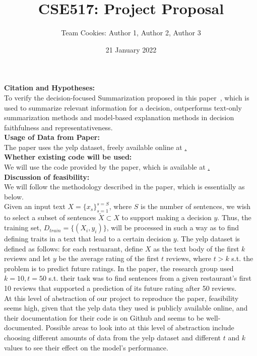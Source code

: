 \documentclass{article}
\title{CSE517: Project Proposal}
\author{Team Cookies: Author 1, Author 2, Author 3}
\date{21 January 2022}
\begin{document}
    \maketitle
    

    \textbf{Citation and Hypotheses:} \\

    To verify the decision-focused Summarization proposed in this paper~\cite{hsu-tan-2021-decision}, which is used to summarize relevant information for a decision,
    outperforms text-only summarization methods and model-based explanation methods in decision faithfulness and representativeness. \\

    \textbf{Usage of Data from Paper:} \\
    The paper uses the yelp dataset, freely available online at \href{https://www.yelp.com/dataset/download}. \\

    \textbf{Whether existing code will be used:} \\
    We will use the code provided by the paper, which is available at \href{https://github.com/ChicagoHAI/decsum}. \\

    \textbf{Discussion of feasibility:} \\
    We will follow the methodology described in the paper, which is essentially as below. \\

    Given an input text $X = \{x_s\}_{s=1}^{s=S}$, where $S$ is the number of sentences, we wish to select a subset of sentences $\tilde{X}\subset X$
    to support making a decision $y$. Thus, the training set, $D_{train} = \{(X_i, y_i)\}$, will be processed in such a way as to find defining traits in a text that lead to a certain
    decision $y$. The yelp dataset is defined as follows: for each restuarant, define $X$ as the text body of the first $k$ reviews and let $y$ be the average rating of the first $t$
    reviews, where $t > k$ s.t. the problem is to predict future ratings. In the paper, the research group used $k=10, t=50$ s.t. their task was to find sentences from a given
    restaurant's first 10 reviews that supported a prediction of its future rating after 50 reviews. \\

    At this level of abstraction of our project to reproduce the paper, feasibility seems high, given that the yelp data they used is publicly available online, and their documentation
    for their code is on Github and seems to be well-documented. Possible areas to look into at this level of abstraction include choosing different amounts of data from the yelp dataset
    and different $t$ and $k$ values to see their effect on the model's performance. \\
\end{document}
